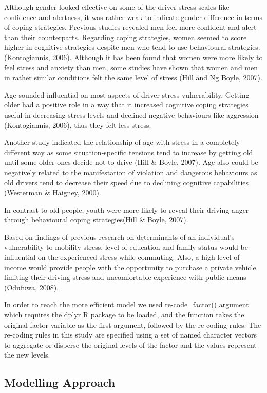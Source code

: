 \documentclass[
11pt, %
oneside, %
english, %
singlespacing, %
]{macthesis} %
\begin{document}
Although gender looked effective on some of the driver stress scales like confidence and alertness, it was rather weak to indicate gender difference in terms of coping strategies. Previous studies revealed men feel more confident and alert than their counterparts. Regarding coping strategies, women seemed to score higher in cognitive strategies despite men who tend to use behavioural strategies. (Kontogiannis, 2006). Although it has been found that women were more likely to feel stress and anxiety than men, some studies have shown that women and men in rather similar conditions felt the same level of stress (Hill and Ng Boyle, 2007).

Age sounded influential on most aspects of driver stress vulnerability. Getting older had a positive role in a way that it increased cognitive coping strategies useful in decreasing stress levels and declined negative behaviours like aggression (Kontogiannis, 2006), thus they felt less stress.

Another study indicated the relationship of age with stress in a completely different way as some situation-specific tensions tend to increase by getting old until some older ones decide not to drive (Hill \& Boyle, 2007). Age also could be negatively related to the manifestation of violation and dangerous behaviours as old drivers tend to decrease their speed due to declining cognitive capabilities (Westerman \& Haigney, 2000).

In contrast to old people, youth were more likely to reveal their driving anger through behavioural coping strategies(Hill \& Boyle, 2007).

Based on findings of previous research on determinants of an individual's vulnerability to mobility stress, level of education and family status would be influential on the experienced stress while commuting. Also, a high level of income would provide people with the opportunity to purchase a private vehicle limiting their driving stress and uncomfortable experience with public means (Odufuwa, 2008).

In order to reach the more efficient model we used re-code\_factor() argument which requires the dplyr R package to be loaded, and the function takes the original factor variable as the first argument, followed by the re-coding rules. The re-coding rules in this study are specified using a set of named character vectors to aggregate or disperse the original levels of the factor and the values represent the new levels.

\hypertarget{modelling-approach}{%
\subsection{Modelling Approach}\label{modelling-approach}}
\end{document}
